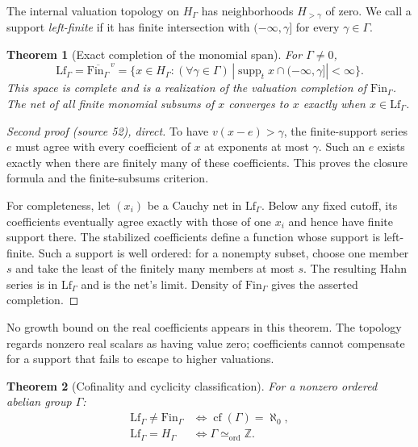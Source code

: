 \documentclass[11pt,letterpaper]{article}
\numberwithin{equation}{section}
\newtheorem{theorem}{Theorem}[section]
\theoremstyle{definition}
\theoremstyle{remark}
\newcommand{\Z}{\mathbb{Z}}
\newcommand{\supp}{\operatorname{supp}}
\newcommand{\cf}{\operatorname{cf}}
\newcommand{\FinS}[1]{\mathrm{Fin}_{#1}}%
\newcommand{\LfS}[1]{\mathrm{Lf}_{#1}}%
\begin{document}
The internal valuation topology on $H_\Gamma$ has neighborhoods $H_{>\gamma}$ of zero. We call a support \emph{left-finite} if it has finite intersection with $(-\infty,\gamma]$ for every $\gamma\in\Gamma$.

\begin{theorem}[Exact completion of the monomial span]\label{rvs:eu:thm:completion}
For $\Gamma\ne0$,
\begin{equation}\label{rvs:eu:eq:completion}
 \LfS{\Gamma}=\overline{\FinS{\Gamma}}^{\,v}
 =\{x\in H_\Gamma:(\forall\gamma\in\Gamma)\,
 |\supp_t x\cap(-\infty,\gamma]|<\infty\}.
\end{equation}
This space is complete and is a realization of the valuation completion of $\FinS{\Gamma}$. The net of all finite monomial subsums of $x$ converges to $x$ exactly when $x\in \LfS{\Gamma}$.
\end{theorem}
\begin{proof}[Second proof (source 52), direct]
To have $v(x-e)>\gamma$, the finite-support series $e$ must agree with every coefficient of $x$ at exponents at most $\gamma$. Such an $e$ exists exactly when there are finitely many of these coefficients. This proves the closure formula and the finite-subsums criterion.

For completeness, let $(x_i)$ be a Cauchy net in $\LfS{\Gamma}$. Below any fixed cutoff, its coefficients eventually agree exactly with those of one $x_i$ and hence have finite support there. The stabilized coefficients define a function whose support is left-finite. Such a support is well ordered: for a nonempty subset, choose one member $s$ and take the least of the finitely many members at most $s$. The resulting Hahn series is in $\LfS{\Gamma}$ and is the net's limit. Density of $\FinS{\Gamma}$ gives the asserted completion.
\end{proof}
No growth bound on the real coefficients appears in this theorem. The topology regards nonzero real scalars as having value zero; coefficients cannot compensate for a support that fails to escape to higher valuations.
\begin{theorem}[Cofinality and cyclicity classification]\label{rvs:eu:thm:cofinality}
For a nonzero ordered abelian group $\Gamma$:
\begin{align*}
 \LfS{\Gamma}\ne \FinS{\Gamma}&\iff\cf(\Gamma)=\aleph_0,\\
 \LfS{\Gamma}=H_\Gamma&\iff\Gamma\simeq_{\mathrm{ord}}\Z.
\end{align*}
\end{theorem}
\end{document}
